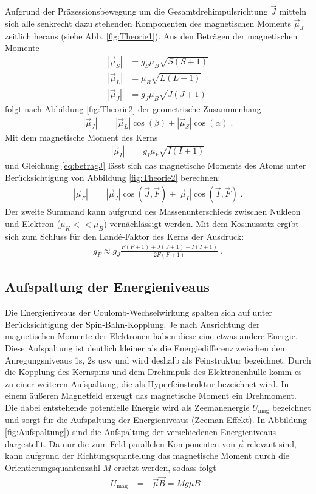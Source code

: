 Aufgrund der Präzessionsbewegung um die Gesamtdrehimpulsrichtung $\vec{J}$ mitteln sich alle senkrecht dazu stehenden Komponenten des magnetischen Moments $\vec{\mu}_J$  zeitlich heraus (siehe Abb. \ref{fig:Theorie1}).
Aus den Beträgen der magnetischen Momente
\begin{align}
	|\vec{\mu}_S|&=g_S\mu_B\sqrt{S(S+1)} \\
	|\vec{\mu}_L|&=\mu_B\sqrt{L(L+1)}\\
	|\vec{\mu}_J|&=g_J\mu_B\sqrt{J(J+1)}
	\label{eq:betragmu1}
\end{align}
folgt nach Abbildung \ref{fig:Theorie2} der geometrische Zusammenhang
\begin{align}
	|\vec{\mu}_J| &= |\vec{\mu}_L| \cos{(\beta)}+ |\vec{\mu}_S| \cos{(\alpha)}\;.
	\label{eq:betragJ}
\end{align}
Mit dem magnetische Moment des Kerns
\begin{align}
	|\vec{\mu}_I|&=g_I\mu_k\sqrt{I(I+1)}
\end{align}
und Gleichung \ref{eq:betragJ} lässt sich das magnetische Moments des Atoms unter Berücksichtigung von Abbildung \ref{fig:Theorie2} berechnen:
\begin{align}
	|\vec{\mu}_F|&=|\vec{\mu}_J|\cos{(\vec{J},\vec{F})} + |\vec{\mu}_I|\cos{(\vec{I},\vec{F})}\;.
	\label{eq:betragF}
\end{align}
Der zweite Summand kann aufgrund des Massenunterschieds zwischen Nukleon und Elektron ($\mu_K<<\mu_B$) vernächlässigt werden.
Mit dem Kosinussatz ergibt sich zum Schluss für den Land\'{e}-Faktor des Kerns der Ausdruck:
\begin{align}
	g_F \approx g_J \frac{F(F+1)+J(J+1)-I(I+1)}{2F(F+1)}\;.
	\label{eq:11}
\end{align}


\subsection{Aufspaltung der Energieniveaus}

Die Energieniveaus der Coulomb-Wechselwirkung spalten sich auf unter Berücksichtigung der Spin-Bahn-Kopplung.
Je nach Ausrichtung der magnetischen Momente der Elektronen haben diese eine etwas andere Energie.
Diese Aufspaltung ist deutlich kleiner als die Energiedifferenz zwischen den Anregungsniveaus 1s, 2s usw und wird deshalb als Feinstruktur bezeichnet.
Durch die Kopplung des Kernspins und dem Drehimpuls des Elektronenhülle komm es zu einer weiteren Aufspaltung, die als Hyperfeinstruktur bezeichnet wird.
In einem äußeren Magnetfeld erzeugt das magnetische Moment ein Drehmoment.
Die dabei entstehende potentielle Energie wird als Zeemanenergie $U_\textrm{mag}$ bezeichnet und sorgt für die Aufspaltung der Energieniveaus (Zeeman-Effekt).
In Abbildung \ref{fig:Aufspaltung}) sind die Aufspaltung der verschiedenen Energieniveaus dargestellt.
Da nur die zum Feld parallelen Komponenten von $\vec{\mu}$ relevant sind, kann aufgrund der Richtungsquantelung das magnetische Moment durch die Orientierungsquantenzahl $M$ ersetzt werden, sodass folgt
\begin{align}
	U_\textrm{mag}&=-\vec{\mu} \vec{B}=Mg\mu B\;.
	\label{eq:7}
\end{align}

